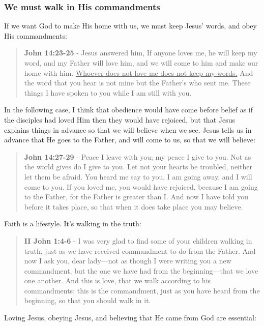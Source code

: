 \documentclass[11pt]{article}
\begin{document}
\subsubsection{We must walk in His commandments}
\label{sec:org27d08f6}
If we want God to make His home with us, we must keep Jesus' words, and obey His commandments:

\begin{quote}
\textbf{John 14:23-25} - Jesus answered him, If anyone loves me, he will keep my word, and my Father will love him, and we will come to him and make our home with him. \uline{Whoever does not love me does not keep my words.} And the word that you hear is not mine but the Father's who sent me. These things I have spoken to you while I am still with you.
\end{quote}

In the following case, I think that obedience would have come before belief as if the disciples had loved Him then they would have rejoiced, but that Jesus explains things in advance so that we will believe when we see. Jesus tells us in advance that He goes to the Father, and will come to us, so that we will believe:

\begin{quote}
\textbf{John 14:27-29} - Peace I leave with you; my peace I give to you. Not as the world gives do I give to you. Let not your hearts be troubled, neither let them be afraid. You heard me say to you, I am going away, and I will come to you. If you loved me, you would have rejoiced, because I am going to the Father, for the Father is greater than I. And now I have told you before it takes place, so that when it does take place you may believe.
\end{quote}

Faith is a lifestyle. It's walking in the truth:

\begin{quote}
\textbf{II John 1:4-6} - I was very glad to find some of your children walking in truth, just as we have received commandment to do from the Father. And now I ask you, dear lady—not as though I were writing you a new commandment, but the one we have had from the beginning—that we love one another. And this is love, that we walk according to his commandments; this is the commandment, just as you have heard from the beginning, so that you should walk in it.
\end{quote}

Loving Jesus, obeying Jesus, and believing that He came from God are essential:
\end{document}

